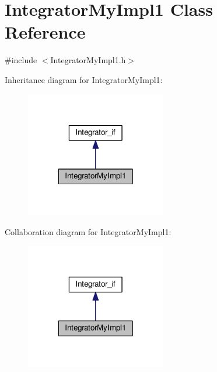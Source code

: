 \hypertarget{class_integrator_my_impl1}{\section{Integrator\-My\-Impl1 Class Reference}
\label{class_integrator_my_impl1}
}


{\ttfamily \#include $<$Integrator\-My\-Impl1.\-h$>$}



Inheritance diagram for Integrator\-My\-Impl1\-:
\nopagebreak
\begin{figure}[H]
\begin{center}
\leavevmode
\includegraphics[width=174pt]{class_integrator_my_impl1__inherit__graph}
\end{center}
\end{figure}


Collaboration diagram for Integrator\-My\-Impl1\-:
\nopagebreak
\begin{figure}[H]
\begin{center}
\leavevmode
\includegraphics[width=174pt]{class_integrator_my_impl1__coll__graph}
\end{center}
\end{figure}
